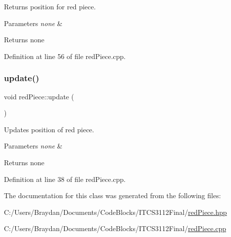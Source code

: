 Returns position for red piece.


\begin{DoxyParams}{Parameters}
{\em none} & \\
\hline
\end{DoxyParams}
\begin{DoxyReturn}{Returns}
none 
\end{DoxyReturn}


Definition at line 56 of file red\+Piece.\+cpp.

\mbox{\label{classred_piece_a90dbfbe8e12b0495e9ff01819b89b5d2}} 
\subsubsection{\texorpdfstring{update()}{update()}}
{\footnotesize\ttfamily void red\+Piece\+::update (\begin{DoxyParamCaption}{ }\end{DoxyParamCaption})}

Updates position of red piece.


\begin{DoxyParams}{Parameters}
{\em none} & \\
\hline
\end{DoxyParams}
\begin{DoxyReturn}{Returns}
none 
\end{DoxyReturn}


Definition at line 38 of file red\+Piece.\+cpp.



The documentation for this class was generated from the following files\+:\begin{DoxyCompactItemize}
\item 
C\+:/\+Users/\+Braydan/\+Documents/\+Code\+Blocks/\+I\+T\+C\+S3112\+Final/\mbox{\hyperlink{red_piece_8hpp}{red\+Piece.\+hpp}}\item 
C\+:/\+Users/\+Braydan/\+Documents/\+Code\+Blocks/\+I\+T\+C\+S3112\+Final/\mbox{\hyperlink{red_piece_8cpp}{red\+Piece.\+cpp}}\end{DoxyCompactItemize}
